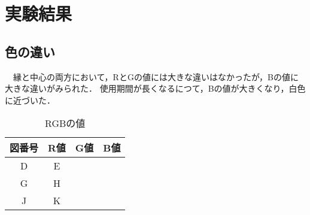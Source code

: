 \documentclass[main]{subfiles}
\begin{document}
\chapter{実験結果}
\section{色の違い}

　縁と中心の両方において，RとGの値には大きな違いはなかったが，Bの値に大きな違いがみられた．
使用期間が長くなるにつて，Bの値が大きくなり，白色に近づいた．


\begin{table}[h]
    \caption{RGBの値}
    \label{table:SpeedOfLight}
    \centering
\begin{tabular}{|c|c|c|c|}
   \hline
   図番号 & R値 & G値 & B値 \\ \hline
   D & E & & \\ \hline
   G & H & & \\ \hline
   J & K & & \\ \hline
\end{tabular}    
\end{table}
\end{document}
